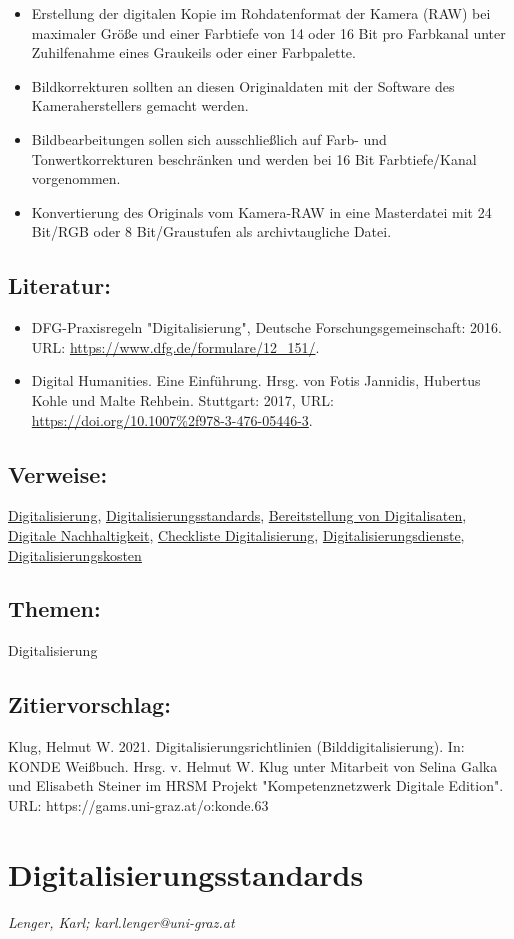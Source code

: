 \documentclass{article}
\begin{document}
        \begin{itemize}\item {Erstellung der digitalen Kopie im Rohdatenformat der Kamera (RAW) bei maximaler Größe und einer Farbtiefe von 14 oder 16 Bit pro Farbkanal unter Zuhilfenahme eines Graukeils oder einer Farbpalette.}\item {Bildkorrekturen sollten an diesen Originaldaten mit der Software des Kameraherstellers gemacht werden. }\item {Bildbearbeitungen sollen sich ausschließlich auf Farb- und Tonwertkorrekturen beschränken und werden bei 16 Bit Farbtiefe/Kanal vorgenommen.}\item {Konvertierung des Originals vom Kamera-RAW in eine Masterdatei mit 24 Bit/RGB oder 8 Bit/Graustufen als archivtaugliche Datei.}\end{itemize}\subsection*{Literatur:}\begin{itemize}\item DFG-Praxisregeln "Digitalisierung", Deutsche Forschungsgemeinschaft: 2016. URL: \url{https://www.dfg.de/formulare/12_151/}.\item Digital Humanities. Eine Einführung. Hrsg. von Fotis Jannidis, Hubertus Kohle und Malte Rehbein. Stuttgart: 2017, URL: \url{https://doi.org/10.1007%2f978-3-476-05446-3}.\end{itemize}\subsection*{Verweise:}\href{https://gams.uni-graz.at/o:konde.60}{Digitalisierung}, \href{https://gams.uni-graz.at/o:konde.64}{Digitalisierungsstandards}, \href{https://gams.uni-graz.at/o:konde.36}{Bereitstellung von Digitalisaten}, \href{https://gams.uni-graz.at/o:konde.6}{Digitale Nachhaltigkeit}, \href{https://gams.uni-graz.at/o:konde.40}{Checkliste Digitalisierung}, \href{https://gams.uni-graz.at/o:konde.61}{Digitalisierungsdienste}, \href{https://gams.uni-graz.at/o:konde.62}{Digitalisierungskosten}\subsection*{Themen:}Digitalisierung\subsection*{Zitiervorschlag:}Klug, Helmut W. 2021. Digitalisierungsrichtlinien (Bilddigitalisierung). In: KONDE Weißbuch. Hrsg. v. Helmut W. Klug unter Mitarbeit von Selina Galka und Elisabeth Steiner im HRSM Projekt "Kompetenznetzwerk Digitale Edition". URL: https://gams.uni-graz.at/o:konde.63\newpage\section*{Digitalisierungsstandards} \emph{Lenger, Karl; karl.lenger@uni-graz.at }\\
        
\end{document}
